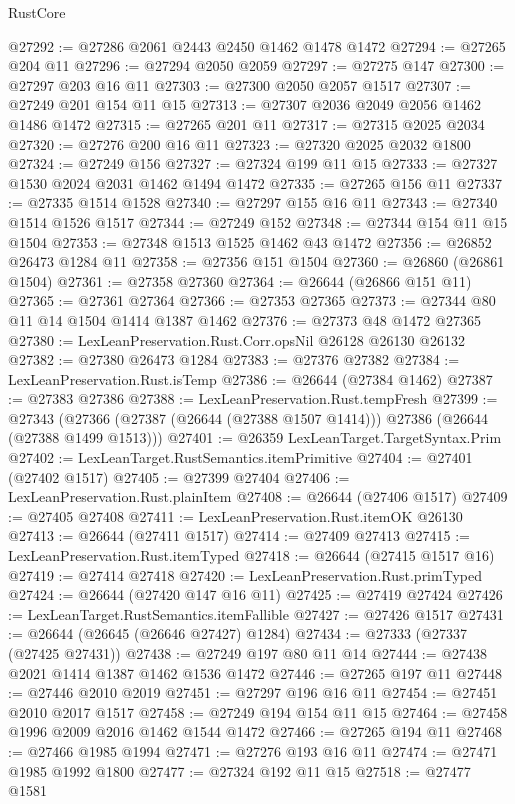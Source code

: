 \begin{lexlean}{RustCore}
\begin{coremodule}
@27292 := @27286 @2061 @2443 @2450 @1462 @1478 @1472
@27294 := @27265 @204 @11
@27296 := @27294 @2050 @2059
@27297 := @27275 @147
@27300 := @27297 @203 @16 @11
@27303 := @27300 @2050 @2057 @1517
@27307 := @27249 @201 @154 @11 @15
@27313 := @27307 @2036 @2049 @2056 @1462 @1486 @1472
@27315 := @27265 @201 @11
@27317 := @27315 @2025 @2034
@27320 := @27276 @200 @16 @11
@27323 := @27320 @2025 @2032 @1800
@27324 := @27249 @156
@27327 := @27324 @199 @11 @15
@27333 := @27327 @1530 @2024 @2031 @1462 @1494 @1472
@27335 := @27265 @156 @11
@27337 := @27335 @1514 @1528
@27340 := @27297 @155 @16 @11
@27343 := @27340 @1514 @1526 @1517
@27344 := @27249 @152
@27348 := @27344 @154 @11 @15 @1504
@27353 := @27348 @1513 @1525 @1462 @43 @1472
@27356 := @26852 @26473 @1284 @11
@27358 := @27356 @151 @1504
@27360 := @26860 (@26861 @1504)
@27361 := @27358 @27360
@27364 := @26644 (@26866 @151 @11)
@27365 := @27361 @27364
@27366 := @27353 @27365
@27373 := @27344 @80 @11 @14 @1504 @1414 @1387 @1462
@27376 := @27373 @48 @1472 @27365
@27380 := LexLeanPreservation.Rust.Corr.opsNil @26128 @26130 @26132
@27382 := @27380 @26473 @1284
@27383 := @27376 @27382
@27384 := LexLeanPreservation.Rust.isTemp
@27386 := @26644 (@27384 @1462)
@27387 := @27383 @27386
@27388 := LexLeanPreservation.Rust.tempFresh
@27399 := @27343
    (@27366 (@27387 (@26644 (@27388 @1507 @1414))) @27386 (@26644 (@27388 @1499 @1513)))
@27401 := @26359 LexLeanTarget.TargetSyntax.Prim
@27402 := LexLeanTarget.RustSemantics.itemPrimitive
@27404 := @27401 (@27402 @1517)
@27405 := @27399 @27404
@27406 := LexLeanPreservation.Rust.plainItem
@27408 := @26644 (@27406 @1517)
@27409 := @27405 @27408
@27411 := LexLeanPreservation.Rust.itemOK @26130
@27413 := @26644 (@27411 @1517)
@27414 := @27409 @27413
@27415 := LexLeanPreservation.Rust.itemTyped
@27418 := @26644 (@27415 @1517 @16)
@27419 := @27414 @27418
@27420 := LexLeanPreservation.Rust.primTyped
@27424 := @26644 (@27420 @147 @16 @11)
@27425 := @27419 @27424
@27426 := LexLeanTarget.RustSemantics.itemFallible
@27427 := @27426 @1517
@27431 := @26644 (@26645 (@26646 @27427) @1284)
@27434 := @27333 (@27337 (@27425 @27431))
@27438 := @27249 @197 @80 @11 @14
@27444 := @27438 @2021 @1414 @1387 @1462 @1536 @1472
@27446 := @27265 @197 @11
@27448 := @27446 @2010 @2019
@27451 := @27297 @196 @16 @11
@27454 := @27451 @2010 @2017 @1517
@27458 := @27249 @194 @154 @11 @15
@27464 := @27458 @1996 @2009 @2016 @1462 @1544 @1472
@27466 := @27265 @194 @11
@27468 := @27466 @1985 @1994
@27471 := @27276 @193 @16 @11
@27474 := @27471 @1985 @1992 @1800
@27477 := @27324 @192 @11 @15
@27518 := @27477
    @1581

\end{coremodule}
\end{lexlean}
